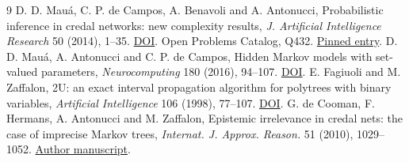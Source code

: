 \documentclass[11pt,a4paper]{amsart}
\begin{document}
\begin{thebibliography}{9}
D. D. Mau\'a, C. P. de Campos, A. Benavoli and A. Antonucci,
Probabilistic inference in credal networks: new complexity results,
\emph{J. Artificial Intelligence Research} 50 (2014), 1--35.
\href{https://doi.org/10.1613/jair.4355}{DOI}.
Open Problems Catalog, Q432.
\href{https://github.com/10m-u/open-problems-catalog/blob/ca8d4d44ba3db527f19f28928c240168f545ecfe/problems/mathematics/probability-stochastic-processes-part-1.md\#q432}{Pinned entry}.
D. D. Mau\'a, A. Antonucci and C. P. de Campos,
Hidden Markov models with set-valued parameters,
\emph{Neurocomputing} 180 (2016), 94--107.
\href{https://doi.org/10.1016/j.neucom.2015.08.095}{DOI}.
E. Fagiuoli and M. Zaffalon, 2U: an exact interval propagation
algorithm for polytrees with binary variables,
\emph{Artificial Intelligence} 106 (1998), 77--107.
\href{https://doi.org/10.1016/S0004-3702(98)00089-7}{DOI}.
G. de Cooman, F. Hermans, A. Antonucci and M. Zaffalon,
Epistemic irrelevance in credal nets: the case of imprecise
Markov trees, \emph{Internat. J. Approx. Reason.} 51 (2010),
1029--1052.
\href{https://arxiv.org/abs/1008.2514}{Author manuscript}.
\end{thebibliography}
\end{document}
